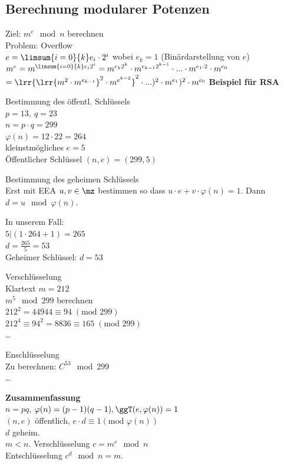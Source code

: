 	\subsection{Berechnung modularer Potenzen}
		Ziel: $m^e\mod n$ berechnen\\
		Problem: Overflow\\
		$e=\limsum{i=0}{k}e_i\cdot 2^i$ wobei $e_k=1$ (Binärdarstellung von $e$)\\
		$m^e=m^{\limsum{i=0}{k}e_i2^i}=m^{e_k2^k}\cdot m^{e_{k-1}2^{k-1}}\cdot ... \cdot m^{e_1\cdot 2}\cdot m^{e_0}$\\
		$=\lrr{\lrr{m^2\cdot m^{e_{k-1}}}^2\cdot m^{e^{k-2}}}^2\cdot ...)^2\cdot m^{e_1})^2\cdot m^{e_0}$
\newpage
		\textbf{Beispiel für RSA}
			\item Bestimmung des öffentl. Schlüssels\\			
				$p=13,\ q=23$\\
				$n=p\cdot q=299$\\
				$\varphi(n)=12\cdot 22=264$\\
				kleinstmögliches $e=5$\\
				Öffentlicher Schlüssel $(n,e)=(299,5)$
			\item Bestimmung des geheimen Schlüssels\\
				Erst mit EEA $u,v\in\mz$
bestimmen so dass $u\cdot e+v\cdot\varphi(n)=1$. Dann $d=u\mod\varphi(n)$.

				In unserem Fall:\\
				$5|(1\cdot 264+1)=265$\\
				$d=\frac{265}{5}=53$\\
				Geheimer Schlüssel: $d=53$
			\item Verschlüsselung\\
				Klartext $m=212$\\
				$m^5\mod 299$ berechnen\\
				$212^2=44944\equiv 94\;(\mbox{mod } 299)$\\
				$212^4\equiv 94^2=8836\equiv 165\;(\mbox{mod } 299)$\\
				\dots
			\item Enschlüsselung\\
				Zu berechnen: $C^{53}\mod 299$\\
				\dots
		\subExEnd
		
		\textbf{Zusammenfassung}\\
		$n=pq$, $\varphi(n)=(p-1)(q-1), \ggT(e,\varphi(n))=1$\\
		$(n,e)$ öffentlich, $e\cdot d\equiv 1(\mbox{mod }\varphi(n))$\\
		$d$ geheim.\\
		$m<n$. Verschlüsselung $c=m^e\mod n$\\
		Entschlüsselung $c^d\mod n=m$.
\newpage		

